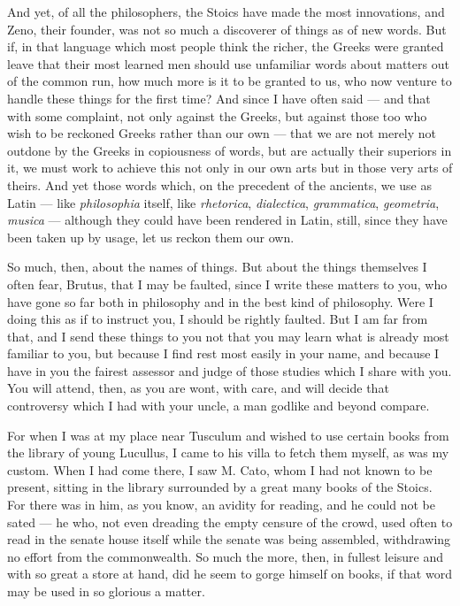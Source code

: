  And yet, of all the philosophers, the Stoics have made the most innovations, and Zeno, their founder, was not so much a discoverer of things as of new words. But if, in that language which most people think the richer, the Greeks were granted leave that their most learned men should use unfamiliar words about matters out of the common run, how much more is it to be granted to us, who now venture to handle these things for the first time? And since I have often said — and that with some complaint, not only against the Greeks, but against those too who wish to be reckoned Greeks rather than our own — that we are not merely not outdone by the Greeks in copiousness of words, but are actually their superiors in it, we must work to achieve this not only in our own arts but in those very arts of theirs. And yet those words which, on the precedent of the ancients, we use as Latin — like \textit{philosophia} itself, like \textit{rhetorica}, \textit{dialectica}, \textit{grammatica}, \textit{geometria}, \textit{musica} — although they could have been rendered in Latin, still, since they have been taken up by usage, let us reckon them our own.

 So much, then, about the names of things. But about the things themselves I often fear, Brutus, that I may be faulted, since I write these matters to you, who have gone so far both in philosophy and in the best kind of philosophy. Were I doing this as if to instruct you, I should be rightly faulted. But I am far from that, and I send these things to you not that you may learn what is already most familiar to you, but because I find rest most easily in your name, and because I have in you the fairest assessor and judge of those studies which I share with you. You will attend, then, as you are wont, with care, and will decide that controversy which I had with your uncle, a man godlike and beyond compare.

 For when I was at my place near Tusculum and wished to use certain books from the library of young Lucullus, I came to his villa to fetch them myself, as was my custom. When I had come there, I saw M. Cato, whom I had not known to be present, sitting in the library surrounded by a great many books of the Stoics. For there was in him, as you know, an avidity for reading, and he could not be sated — he who, not even dreading the empty censure of the crowd, used often to read in the senate house itself while the senate was being assembled, withdrawing no effort from the commonwealth. So much the more, then, in fullest leisure and with so great a store at hand, did he seem to gorge himself on books, if that word may be used in so glorious a matter.

